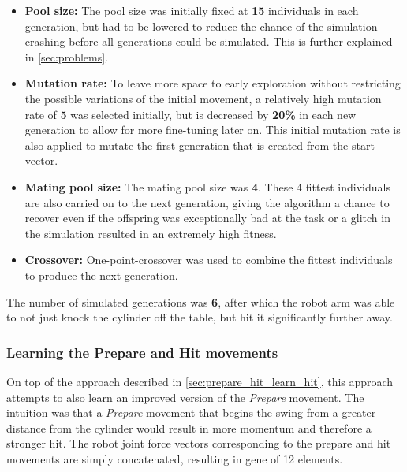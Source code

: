 \begin{itemize}
\item \textbf{Pool size:} The pool size was initially fixed at \textbf{15} individuals in each generation, but had to be lowered to reduce the chance of the simulation crashing before all generations could be simulated. This is further explained in \ref{sec:problems}.
\item \textbf{Mutation rate:} To leave more space to early exploration without restricting the possible variations of the initial movement, a relatively high mutation rate of \textbf{5} was selected initially, but is decreased by \textbf{20\%} in each new generation to allow for more fine-tuning later on. This initial mutation rate is also applied to mutate the first generation that is created from the start vector.
\item \textbf{Mating pool size:} The mating pool size was \textbf{4}. These 4 fittest individuals are also carried on to the next generation, giving the algorithm a chance to recover even if the offspring was exceptionally bad at the task or a glitch in the simulation resulted in an extremely high fitness.
\item \textbf{Crossover:} One-point-crossover was used to combine the fittest individuals to produce the next generation.
\end{itemize}

The number of simulated generations was \textbf{6}, after which the robot arm was able to not just knock the cylinder off the table, but hit it significantly further away.


\subsubsection{Learning the Prepare and Hit movements} 

On top of the approach described in \ref{sec:prepare_hit_learn_hit}, this approach attempts to also learn an improved version of the \textit{Prepare} movement. The intuition was that a \textit{Prepare} movement that begins the swing from a greater distance from the cylinder would result in more momentum and therefore a stronger hit.
The robot joint force vectors corresponding to the prepare and hit movements are simply concatenated, resulting in gene of 12 elements.

